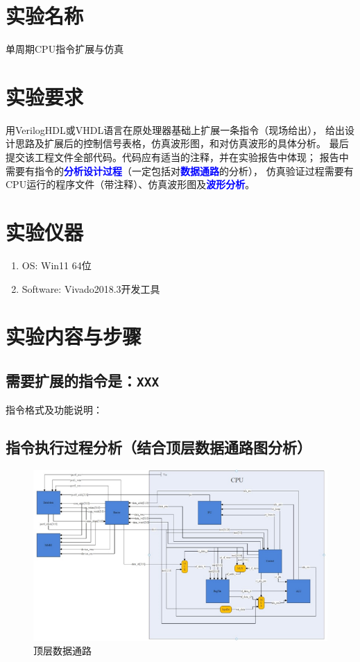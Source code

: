 \documentclass[]{USTBReport}
\newcommand{\hl}[1]{\textbf{\textcolor{blue}{#1}}}
\begin{document}
    \maketitle


    \section{实验名称}
    单周期CPU指令扩展与仿真


    \section{实验要求}
    用VerilogHDL或VHDL语言在原处理器基础上扩展一条指令（现场给出），
    给出设计思路及扩展后的控制信号表格，仿真波形图，和对仿真波形的具体分析。
    最后提交该工程文件全部代码。代码应有适当的注释，并在实验报告中体现；
    报告中需要有指令的\hl{分析设计过程}（一定包括对\hl{数据通路}的分析），
    仿真验证过程需要有CPU运行的程序文件（带注释）、仿真波形图及\hl{波形分析}。

    \FloatBarrier
    \section{实验仪器}
    \begin{enumerate}
        \item OS: Win11 64位
        \item Software: Vivado2018.3开发工具
    \end{enumerate}


    \FloatBarrier
    \section{实验内容与步骤}

    \subsection{需要扩展的指令是：\texttt{XXX}}
    指令格式及功能说明：

    \subsection{指令执行过程分析（结合顶层数据通路图分析）}
    \begin{figure}
        \centering
        \includegraphics[width=\textwidth]{figure/top}
        \caption{顶层数据通路}
        \label{fig:1}
    \end{figure}
\end{document}
